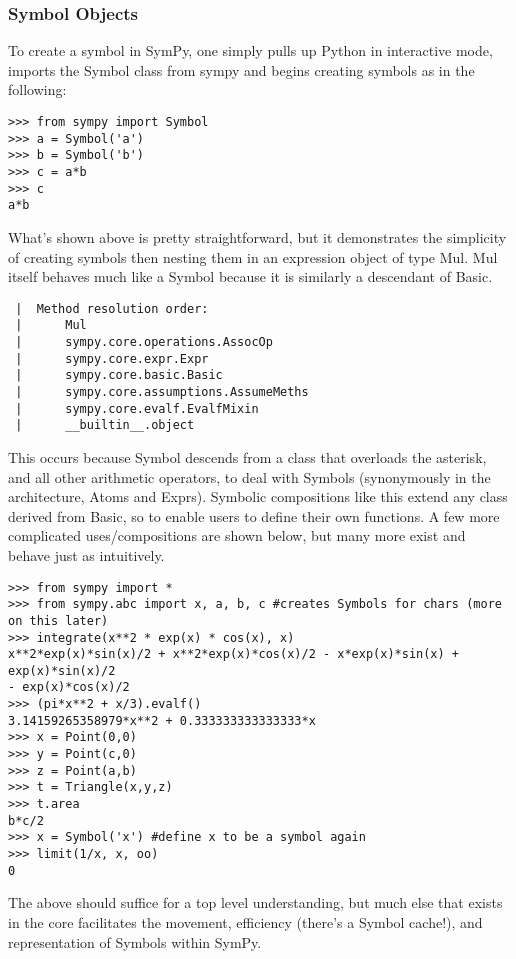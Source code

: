 \documentclass[11pt]{article}
\begin{document}
\subsubsection{\small Symbol Objects}
To create a symbol in SymPy, one simply pulls up Python in interactive mode, imports the Symbol class from sympy and begins creating symbols as in the following:
\begin{verbatim}
>>> from sympy import Symbol
>>> a = Symbol('a')
>>> b = Symbol('b')
>>> c = a*b
>>> c
a*b
\end{verbatim}
What's shown above is pretty straightforward, but it demonstrates the simplicity of creating symbols then nesting them in an expression object of type Mul. Mul itself behaves much like a Symbol because it is similarly a descendant of Basic.
\begin{verbatim}
 |  Method resolution order:
 |      Mul
 |      sympy.core.operations.AssocOp
 |      sympy.core.expr.Expr
 |      sympy.core.basic.Basic
 |      sympy.core.assumptions.AssumeMeths
 |      sympy.core.evalf.EvalfMixin
 |      __builtin__.object
\end{verbatim}
This occurs because Symbol descends from a class that overloads the asterisk, and all other arithmetic operators, to deal with Symbols (synonymously in the architecture, Atoms and Exprs). Symbolic compositions like this extend any class derived from Basic, so to enable users to define their own functions. A few more complicated uses/compositions are shown below, but many more exist and behave just as intuitively.
\begin{verbatim}
>>> from sympy import *
>>> from sympy.abc import x, a, b, c #creates Symbols for chars (more on this later)
>>> integrate(x**2 * exp(x) * cos(x), x)
x**2*exp(x)*sin(x)/2 + x**2*exp(x)*cos(x)/2 - x*exp(x)*sin(x) + exp(x)*sin(x)/2 
- exp(x)*cos(x)/2
>>> (pi*x**2 + x/3).evalf()
3.14159265358979*x**2 + 0.333333333333333*x
>>> x = Point(0,0)
>>> y = Point(c,0)
>>> z = Point(a,b)
>>> t = Triangle(x,y,z)
>>> t.area
b*c/2
>>> x = Symbol('x') #define x to be a symbol again
>>> limit(1/x, x, oo)
0
\end{verbatim}
The above should suffice for a top level understanding, but much else that exists in the core facilitates the movement, efficiency (there's a Symbol cache!), and representation of Symbols within SymPy.
\end{document}

